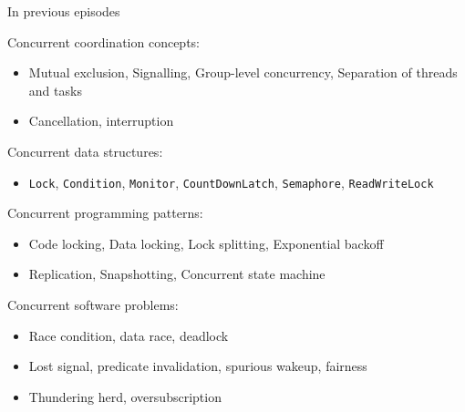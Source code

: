 \begin{frame}{In previous episodes}

Concurrent coordination concepts:
\begin{itemize}
    \item Mutual exclusion, Signalling, Group-level concurrency, Separation of threads and tasks
    \item Cancellation, interruption
\end{itemize}

Concurrent data structures:
\begin{itemize}
    \item \texttt{Lock}, \texttt{Condition}, \texttt{Monitor}, \texttt{CountDownLatch}, \texttt{Semaphore}, \texttt{ReadWriteLock}
\end{itemize}

Concurrent programming patterns:
\begin{itemize}
    \item Code locking, Data locking, Lock splitting, Exponential backoff
    \item Replication, Snapshotting, Concurrent state machine 
\end{itemize}

Concurrent software problems:
\begin{itemize}
    \item Race condition, data race, deadlock
    \item Lost signal, predicate invalidation, spurious wakeup, fairness    
    \item Thundering herd, oversubscription
\end{itemize}

\end{frame}

